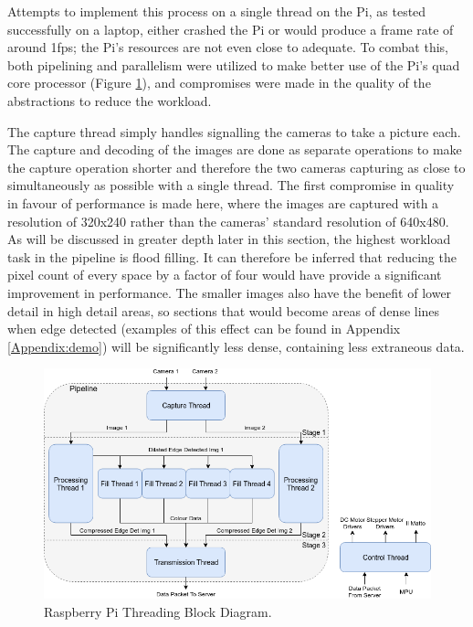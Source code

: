 Attempts to implement this process on a single thread on the Pi, as tested successfully on a laptop, either crashed the Pi or would produce a frame rate of around 1fps; the Pi's resources are not even close to adequate. To combat this, both pipelining and parallelism were utilized to make better use of the Pi's quad core processor (Figure \ref{fig:threads}), and compromises were made in the quality of the abstractions to reduce the workload.

The capture thread simply handles signalling the cameras to take a picture each. The capture and decoding of the images are done as separate operations to make the capture operation shorter and therefore the two cameras capturing as close to simultaneously as possible with a single thread. The first compromise in quality in favour of performance is made here, where the images are captured with a resolution of 320x240 rather than the cameras' standard resolution of 640x480. As will be discussed in greater depth later in this section, the highest workload task in the pipeline is flood filling. It can therefore be inferred that reducing the pixel count of every space by a factor of four would have provide a significant improvement in performance. The smaller images also have the benefit of lower detail in high detail areas, so sections that would become areas of dense lines when edge detected (examples of this effect can be found in Appendix \ref{Appendix:demo}) will be significantly less dense, containing less extraneous data.

\begin{figure}[H]
    \begin{center}
      \includegraphics[width=1\textwidth]{Figures/Threads.png}
      \caption[Raspberry Pi Threading Block Diagram]{Raspberry Pi Threading Block Diagram.}
      \label{fig:threads}
    \end{center}
\end{figure}


